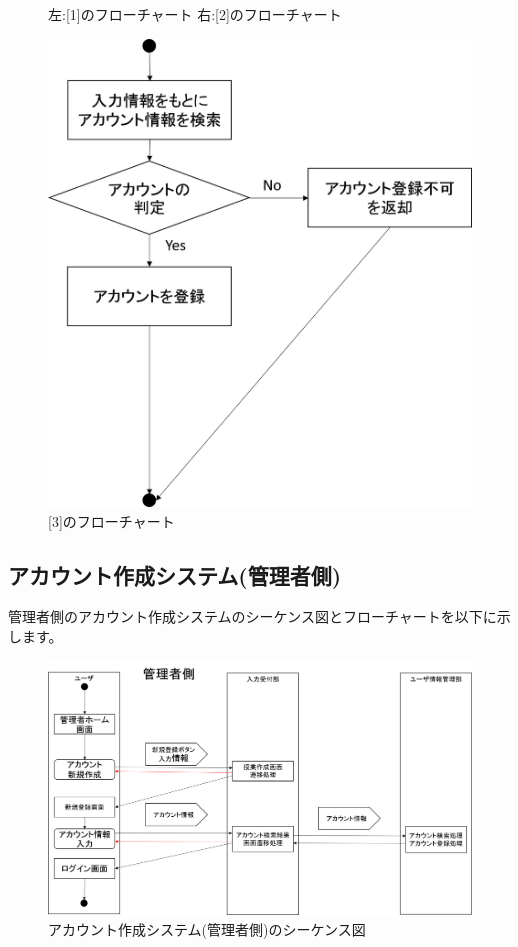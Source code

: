 \begin{figure}[htbp]
\begin{minipage}{0.5\hsize}
\begin{center}
  \end{center}
 \end{minipage}
 \caption{左:[1]のフローチャート 右:[2]のフローチャート}\label{fig:createaccountflow0}
\end{figure}

\begin{figure}[htbp]
  \begin{center}
    \includegraphics[width=0.5\linewidth,clip]{./img/create_account/sub3.png}
    \caption{[3]のフローチャート}\label{fig:createaccountflow1}
  \end{center}
\end{figure}

\newpage
\subsection{アカウント作成システム(管理者側)}
管理者側のアカウント作成システムのシーケンス図とフローチャートを以下に示します。

\begin{figure}[htbp]
  \begin{center}
    \includegraphics[width=1\linewidth,clip]{./img/admin_create_account/main.png}
    \caption{アカウント作成システム(管理者側)のシーケンス図}\label{fig:admincreateseaquence}
  \end{center}
\end{figure}

